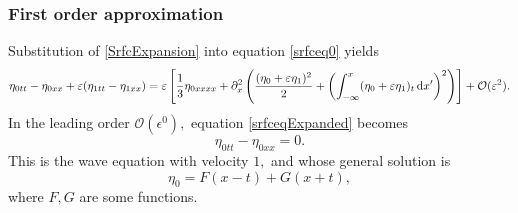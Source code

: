 \documentclass[10pt,reqno,oneside,a4paper]{article}
\begin{document}
\subsubsection*{First order approximation}
Substitution of \eqref{SrfcExpansion} into equation \eqref{srfceq0} yields
\begin{equation}\label{srfceqExpanded}
\eta_{0tt} - \eta_{0xx} +\varepsilon(\eta_{1tt} - \eta_{1xx})= \varepsilon \left[ \frac{1}{3}\eta_{0xxxx} +  \partial_x^2 \left( \frac{(\eta_0 + \varepsilon \eta_1)^2}{2} + \left( \int^{x}_{-\infty} (\eta_0 + \varepsilon \eta_1)_t \,\mathrm{d} x' \right)^2\right)\right] + \mathcal{O}(\varepsilon^2). 
\end{equation}
In the leading order $\mathcal{O}(\epsilon^0),$ equation \eqref{srfceqExpanded} becomes
\begin{equation}\label{1stOrderApprox}
\eta_{0tt} - \eta_{0xx} = 0.
\end{equation}
This is the wave equation with velocity $1,$ and whose general solution is 
\[ \eta_0 = F(x-t) + G(x+t), \]
where $F,G$ are some functions. 
\end{document}
